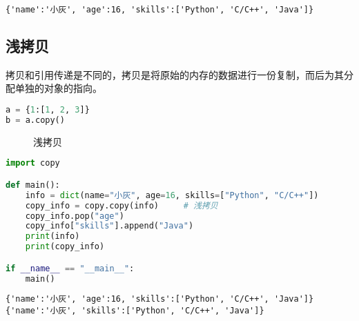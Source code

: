 \begin{tcolorbox}
	\begin{verbatim}
{'name':'小灰', 'age':16, 'skills':['Python', 'C/C++', 'Java']}
\end{verbatim}
\end{tcolorbox}

\vspace{0.5cm}

\subsection{浅拷贝}

拷贝和引用传递是不同的，拷贝是将原始的内存的数据进行一份复制，而后为其分配单独的对象的指向。

\vspace{-0.5cm}

\begin{lstlisting}[language=Python]
a = {1:[1, 2, 3]}
b = a.copy()
\end{lstlisting}

\begin{figure}[H]
	\centering
	\caption{浅拷贝}
\end{figure}

\vspace{0.5cm}


\begin{lstlisting}[language=Python]
import copy

def main():
    info = dict(name="小灰", age=16, skills=["Python", "C/C++"])
    copy_info = copy.copy(info)     # 浅拷贝
    copy_info.pop("age")
    copy_info["skills"].append("Java")
    print(info)
    print(copy_info)

if __name__ == "__main__":
    main()
\end{lstlisting}

\begin{tcolorbox}
	\begin{verbatim}
{'name':'小灰', 'age':16, 'skills':['Python', 'C/C++', 'Java']}
{'name':'小灰', 'skills':['Python', 'C/C++', 'Java']}
\end{verbatim}
\end{tcolorbox}

